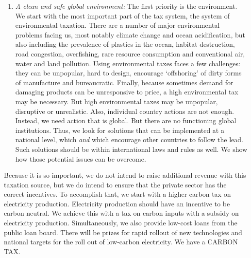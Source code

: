 \documentclass[]{tufte-handout}
\providecommand{\tightlist}{%
  \setlength{\itemsep}{0pt}\setlength{\parskip}{0pt}}
\begin{document}
\begin{enumerate}
\def\labelenumi{\arabic{enumi}.}
\tightlist
\item
  \emph{A clean and safe global environment:} The first priority is the
  environment. We start with the most important part of the tax system,
  the system of environmental taxation. There are a number of major
  environmental problems facing us, most notably climate change and
  ocean acidification, but also including the prevalence of plastics in
  the ocean, habitat destruction, road congestion, overfishing, rare
  resource consumption and conventional air, water and land pollution.
  Using environmental taxes faces a few challenges: they can be
  unpopular, hard to design, encourage `offshoring' of dirty forms of
  manufacture and bureaucratic. Finally, because sometimes demand for
  damaging products can be unresponsive to price, a high environmental
  tax may be necessary. But high environmental taxes may be unpopular,
  disruptive or unrealistic. Also, individual country actions are not
  enough. Instead, we need action that is global. But there are no
  functioning global institutions. Thus, we look for solutions that can
  be implemented at a national level, which \emph{and} which encourage
  other countries to follow the lead. Such solutions should be within
  international laws and rules as well. We show how those potential
  issues can be overcome.
\end{enumerate}

Because it is so important, we do not intend to raise additional revenue
with this taxation source, but we do intend to ensure that the private
sector has the correct incentives. To accomplish that, we start with a
higher carbon tax on electricity production. Electricity production
should have an incentive to be carbon neutral. We achieve this with a
tax on carbon inputs with a subsidy on electricity production.
Simultaneously, we also provide low-cost loans from the public loan
board. There will be prizes for rapid rollout of new technologies and
national targets for the roll out of low-carbon electricity. We have a
CARBON TAX.
\end{document}
